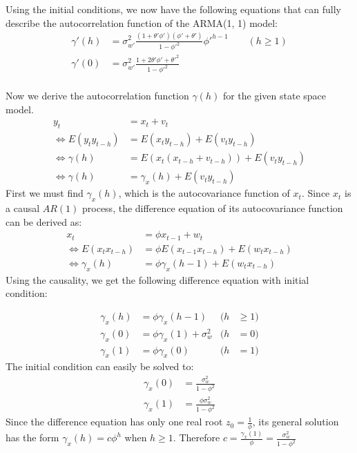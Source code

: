 Using the initial conditions, we now have the following equations that can fully describe the autocorrelation function of the ARMA(1, 1) model: 
\begin{equation} \label{eq:ARMA11_acf}
\begin{split}
\gamma'(h) &= \sigma^2_{w'} \frac{(1+\theta'\phi')(\phi'+\theta')}{1-\phi'^2} \phi'^{h-1} \qquad (h \geq 1) \\
\gamma'(0) &= \sigma^2_{w'} \frac{1+2\theta'\phi'+\theta'^2}{1-\phi'^2} \\
\end{split}
\end{equation}

Now we derive the autocorrelation function $\gamma(h)$ for the given state space model.
\begin{equation} \label{eq:statespace_acf_half}
\begin{split}
	y_t &= x_t + v_t \\
\Leftrightarrow E(y_ty_{t-h}) &= E(x_t y_{t-h}) + E(v_t y_{t-h})\\
\Leftrightarrow \gamma(h) &= E(x_t (x_{t-h}+v_{t-h})) + E(v_t y_{t-h}) \\
\Leftrightarrow \gamma(h) &= \gamma_x(h) + E(v_t y_{t-h}) 
\end{split}	
\end{equation}
First we  must find $\gamma_x(h)$, which is the autocovariance function of $x_t$. Since $x_t$ is a causal $AR(1)$ process, the difference equation of its autocovariance function can be derived as:
\begin{equation}
\begin{split}
	x_t &= \phi x_{t-1} + w_t \\
\Leftrightarrow E(x_tx_{t-h}) &= \phi E(x_{t-1}x_{t-h})+E(w_t x_{t-h})\\
\Leftrightarrow \gamma_x(h) &= \phi \gamma_x(h-1) +E(w_t x_{t-h})
\end{split}
\end{equation} 
Using the causality, we get the following difference equation with initial condition:

\begin{align*}
\gamma_x(h) &= \phi \gamma_x(h-1) & (h &\geq 1) \\
\gamma_x(0) &= \phi \gamma_x(1) + \sigma^2_w & (h &= 0)\\
\gamma_x(1) &= \phi \gamma_x(0) & (h &= 1)
\end{align*}
The initial condition can easily be solved to:
\begin{equation}
\begin{split}
\gamma_x(0) &= \frac{\sigma^2_w}{1-\phi^2} \\
\gamma_x(1) &= \frac{\phi\sigma^2_w}{1-\phi^2}
\end{split} 
\end{equation}
Since the difference equation has only one real root $z_0 = \frac{1}{\phi}$, its general solution has the form $\gamma_x(h) = c \phi^{h}$ when $h \geq 1$. Therefore $c = \frac{\gamma_x(1)}{\phi} = \frac{\sigma_w^2}{1-\phi^2}$

